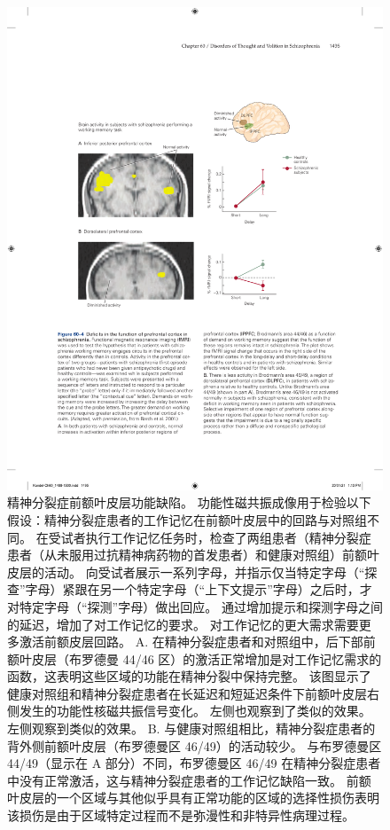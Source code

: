 \begin{figure}[htbp]
	\centering
	\includegraphics[width=0.8\linewidth]{chap60/fig_60_4}
	\caption{精神分裂症前额叶皮层功能缺陷。
		功能性磁共振成像用于检验以下假设：精神分裂症患者的工作记忆在前额叶皮层中的回路与对照组不同。
		在受试者执行工作记忆任务时，检查了两组患者（精神分裂症患者（从未服用过抗精神病药物的首发患者）和健康对照组）前额叶皮层的活动。
		向受试者展示一系列字母，并指示仅当特定字母（“探查”字母）紧跟在另一个特定字母（“上下文提示”字母）之后时，才对特定字母（“探测”字母）做出回应。
		通过增加提示和探测字母之间的延迟，增加了对工作记忆的要求。
		对工作记忆的更大需求需要更多激活前额皮层回路\cite{barch2001selective}。
		A. 在精神分裂症患者和对照组中，后下部前额叶皮层（布罗德曼 44/46 区）的激活正常增加是对工作记忆需求的函数，这表明这些区域的功能在精神分裂中保持完整。
		该图显示了健康对照组和精神分裂症患者在长延迟和短延迟条件下前额叶皮层右侧发生的功能性核磁共振信号变化。
		左侧也观察到了类似的效果。
		左侧观察到类似的效果。
		B. 与健康对照组相比，精神分裂症患者的背外侧前额叶皮层（布罗德曼区 46/49）的活动较少。
		与布罗德曼区 44/49（显示在 A 部分）不同，布罗德曼区 46/49 在精神分裂症患者中没有正常激活，这与精神分裂症患者的工作记忆缺陷一致。
		前额叶皮层的一个区域与其他似乎具有正常功能的区域的选择性损伤表明该损伤是由于区域特定过程而不是弥漫性和非特异性病理过程。}
	\label{fig:60_4}
\end{figure}


